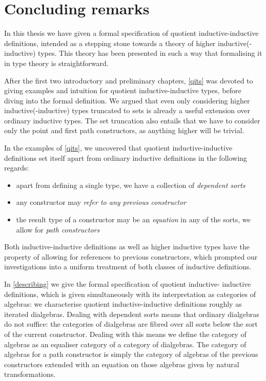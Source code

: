 \chapter{Concluding remarks}
\label{conclusion}

In this thesis we have given a formal specification of quotient
inductive-inductive definitions, intended as a stepping stone towards
a theory of higher inductive(-inductive) types. This theory has been
presented in such a way that formalising it in type theory is
straightforward.

After the first two introductory and preliminary chapters, \cref{qits}
was devoted to giving examples and intuition for quotient
inductive-inductive types, before diving into the formal
definition. We argued that even only considering higher
inductive(-inductive) types truncated to sets is already a useful
extension over ordinary inductive types. The set truncation also
entails that we have to consider only the point and first path
constructors, as anything higher will be trivial. 

In the examples of \cref{qits}, we uncovered that quotient
inductive-inductive definitions set itself apart from ordinary
inductive definitions in the following regards:
%
\begin{itemize}
\item apart from defining a single type, we have a collection of \emph{dependent sorts}
\item any constructor may \emph{refer to any previous constructor}
\item the result type of a constructor may be an \emph{equation} in
  any of the sorts, \ie we allow for \emph{path constructors}
\end{itemize}
%
Both inductive-inductive definitions as well as higher inductive types
have the property of allowing for references to previous constructors,
which prompted our investigations into a uniform treatment of both
classes of inductive definitions.

In \cref{describing} we give the formal specification of quotient
inductive- inductive definitions, which is given simultaneously with
its interpretation as categories of algebras: we characterise quotient
inductive-inductive definitions roughly as iterated
dialgebras. Dealing with dependent sorts means that ordinary
dialgebras do not suffice: the categories of dialgebras are fibred
over all sorts below the sort of the current constructor. Dealing with
this means we define the category of algebras as an equaliser category
of a category of dialgebras. The category of algebras for a path
constructor is simply the category of algebras of the previous
constructors extended with an equation on those algebras given by
natural transformations.

